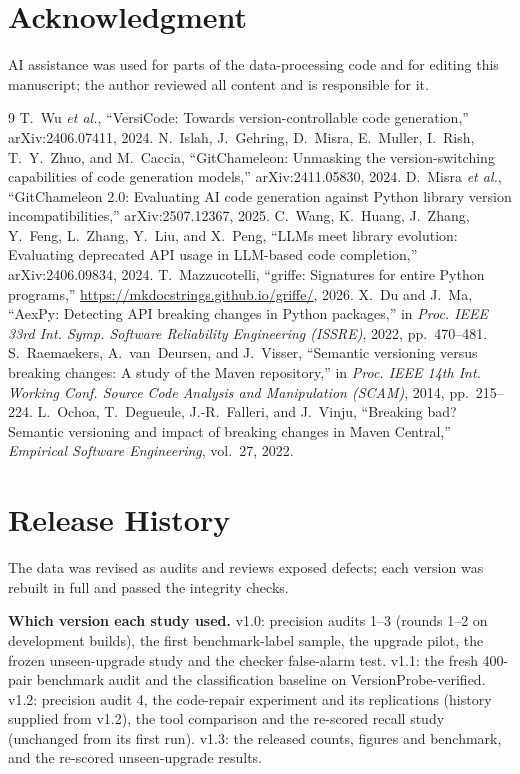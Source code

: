 \documentclass[10pt,twocolumn,letterpaper]{article}
\begin{document}
\section*{Acknowledgment}
AI assistance was used for parts of the data-processing code and for editing this manuscript; the author reviewed
all content and is responsible for it.

\balance
\begin{thebibliography}{9}\footnotesize
{} T.~Wu \emph{et al.}, ``VersiCode: Towards version-controllable code generation,'' arXiv:2406.07411, 2024.
 N.~Islah, J.~Gehring, D.~Misra, E.~Muller, I.~Rish, T.~Y.~Zhuo, and M.~Caccia, ``GitChameleon: Unmasking the version-switching capabilities of code generation models,'' arXiv:2411.05830, 2024.
 D.~Misra \emph{et al.}, ``GitChameleon 2.0: Evaluating AI code generation against Python library version incompatibilities,'' arXiv:2507.12367, 2025.
 C.~Wang, K.~Huang, J.~Zhang, Y.~Feng, L.~Zhang, Y.~Liu, and X.~Peng, ``LLMs meet library evolution: Evaluating deprecated API usage in LLM-based code completion,'' arXiv:2406.09834, 2024.
 T.~Mazzucotelli, ``griffe: Signatures for entire Python programs,'' \url{https://mkdocstrings.github.io/griffe/}, 2026.
 X.~Du and J.~Ma, ``AexPy: Detecting API breaking changes in Python packages,'' in \emph{Proc. IEEE 33rd Int. Symp. Software Reliability Engineering (ISSRE)}, 2022, pp.~470--481.
 S.~Raemaekers, A.~van~Deursen, and J.~Visser, ``Semantic versioning versus breaking changes: A study of the Maven repository,'' in \emph{Proc. IEEE 14th Int. Working Conf. Source Code Analysis and Manipulation (SCAM)}, 2014, pp.~215--224.
 L.~Ochoa, T.~Degueule, J.-R.~Falleri, and J.~Vinju, ``Breaking bad? Semantic versioning and impact of breaking changes in Maven Central,'' \emph{Empirical Software Engineering}, vol.~27, 2022.
\end{thebibliography}

\appendix
\section{Release History}\label{sec:history}
The data was revised as audits and reviews exposed defects; each version was rebuilt in full and passed the integrity
checks.

\textbf{Which version each study used.} v1.0: precision audits 1--3 (rounds 1--2 on development builds), the
first benchmark-label sample, the upgrade pilot, the frozen unseen-upgrade study and the checker false-alarm test. v1.1:
the fresh 400-pair benchmark audit and the classification baseline on VersionProbe-verified. v1.2: precision audit 4,
the code-repair experiment and its replications (history supplied from v1.2), the tool comparison and the re-scored
recall study (unchanged from its first run). v1.3: the released counts, figures and benchmark, and the re-scored
unseen-upgrade results.
\end{document}
